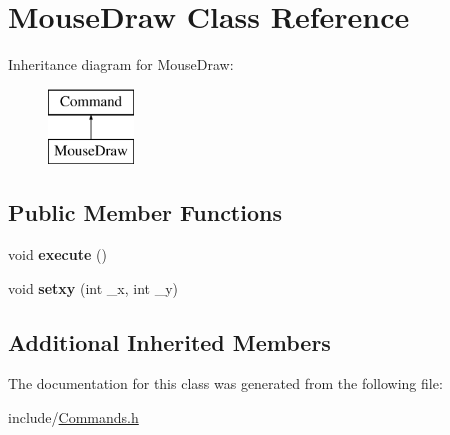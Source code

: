 \hypertarget{classMouseDraw}{\section{Mouse\-Draw Class Reference}
\label{classMouseDraw}
}
Inheritance diagram for Mouse\-Draw\-:\begin{figure}[H]
\begin{center}
\leavevmode
\includegraphics[height=2.000000cm]{classMouseDraw}
\end{center}
\end{figure}
\subsection*{Public Member Functions}
\begin{DoxyCompactItemize}
\item 
\hypertarget{classMouseDraw_ab0f1961e3461c2b42fd4f86e08c2737d}{void {\bfseries execute} ()}\label{classMouseDraw_ab0f1961e3461c2b42fd4f86e08c2737d}

\item 
\hypertarget{classMouseDraw_a2f43c42883ca9e8e623745bef1d03bfa}{void {\bfseries setxy} (int \-\_\-x, int \-\_\-y)}\label{classMouseDraw_a2f43c42883ca9e8e623745bef1d03bfa}

\end{DoxyCompactItemize}
\subsection*{Additional Inherited Members}


The documentation for this class was generated from the following file\-:\begin{DoxyCompactItemize}
\item 
include/\hyperlink{Commands_8h}{Commands.\-h}\end{DoxyCompactItemize}
